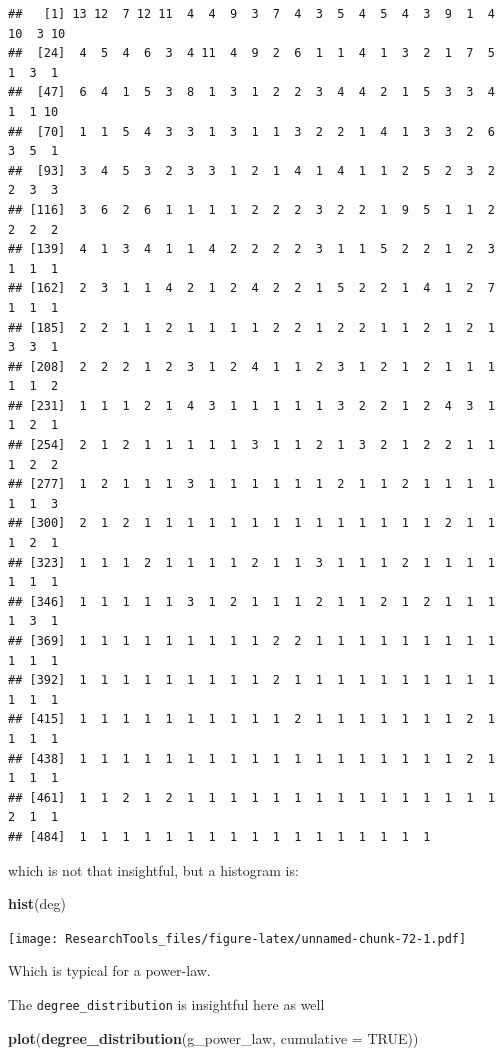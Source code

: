 \documentclass[]{article}
\newenvironment{Shaded}{\begin{snugshade}}{\end{snugshade}}
\newcommand{\KeywordTok}[1]{\textcolor[rgb]{0.13,0.29,0.53}{\textbf{#1}}}
\newcommand{\DataTypeTok}[1]{\textcolor[rgb]{0.13,0.29,0.53}{#1}}
\newcommand{\OtherTok}[1]{\textcolor[rgb]{0.56,0.35,0.01}{#1}}
\newcommand{\NormalTok}[1]{#1}
\theoremstyle{definition}
\theoremstyle{definition}
\theoremstyle{definition}
\theoremstyle{remark}
\begin{document}
\begin{verbatim}
##   [1] 13 12  7 12 11  4  4  9  3  7  4  3  5  4  5  4  3  9  1  4 10  3 10
##  [24]  4  5  4  6  3  4 11  4  9  2  6  1  1  4  1  3  2  1  7  5  1  3  1
##  [47]  6  4  1  5  3  8  1  3  1  2  2  3  4  4  2  1  5  3  3  4  1  1 10
##  [70]  1  1  5  4  3  3  1  3  1  1  3  2  2  1  4  1  3  3  2  6  3  5  1
##  [93]  3  4  5  3  2  3  3  1  2  1  4  1  4  1  1  2  5  2  3  2  2  3  3
## [116]  3  6  2  6  1  1  1  1  2  2  2  3  2  2  1  9  5  1  1  2  2  2  2
## [139]  4  1  3  4  1  1  4  2  2  2  2  3  1  1  5  2  2  1  2  3  1  1  1
## [162]  2  3  1  1  4  2  1  2  4  2  2  1  5  2  2  1  4  1  2  7  1  1  1
## [185]  2  2  1  1  2  1  1  1  1  2  2  1  2  2  1  1  2  1  2  1  3  3  1
## [208]  2  2  2  1  2  3  1  2  4  1  1  2  3  1  2  1  2  1  1  1  1  1  2
## [231]  1  1  1  2  1  4  3  1  1  1  1  1  3  2  2  1  2  4  3  1  1  2  1
## [254]  2  1  2  1  1  1  1  1  3  1  1  2  1  3  2  1  2  2  1  1  1  2  2
## [277]  1  2  1  1  1  3  1  1  1  1  1  1  2  1  1  2  1  1  1  1  1  1  3
## [300]  2  1  2  1  1  1  1  1  1  1  1  1  1  1  1  1  1  2  1  1  1  2  1
## [323]  1  1  1  2  1  1  1  1  2  1  1  3  1  1  1  2  1  1  1  1  1  1  1
## [346]  1  1  1  1  1  3  1  2  1  1  1  2  1  1  2  1  2  1  1  1  1  3  1
## [369]  1  1  1  1  1  1  1  1  1  2  2  1  1  1  1  1  1  1  1  1  1  1  1
## [392]  1  1  1  1  1  1  1  1  1  2  1  1  1  1  1  1  1  1  1  1  1  1  1
## [415]  1  1  1  1  1  1  1  1  1  1  2  1  1  1  1  1  1  1  2  1  1  1  1
## [438]  1  1  1  1  1  1  1  1  1  1  1  1  1  1  1  1  1  1  2  1  1  1  1
## [461]  1  1  2  1  2  1  1  1  1  1  1  1  1  1  1  1  1  1  1  1  2  1  1
## [484]  1  1  1  1  1  1  1  1  1  1  1  1  1  1  1  1  1
\end{verbatim}

which is not that insightful, but a histogram is:

\begin{Shaded}
\begin{Highlighting}[]
 \KeywordTok{hist}\NormalTok{(deg)}
\end{Highlighting}
\end{Shaded}

\texttt{[image: ResearchTools\_files/figure-latex/unnamed-chunk-72-1.pdf]}

Which is typical for a power-law.

The \texttt{degree\_distribution} is insightful here as well

\begin{Shaded}
\begin{Highlighting}[]
\KeywordTok{plot}\NormalTok{(}\KeywordTok{degree_distribution}\NormalTok{(g_power_law, }\DataTypeTok{cumulative =} \OtherTok{TRUE}\NormalTok{))}
\end{Highlighting}
\end{Shaded}
\end{document}

